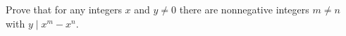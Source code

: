 Prove that for any integers $x$ and $y\ne0$ there are nonnegative integers $m\ne n$ with $y\mid x^m-x^n$.
